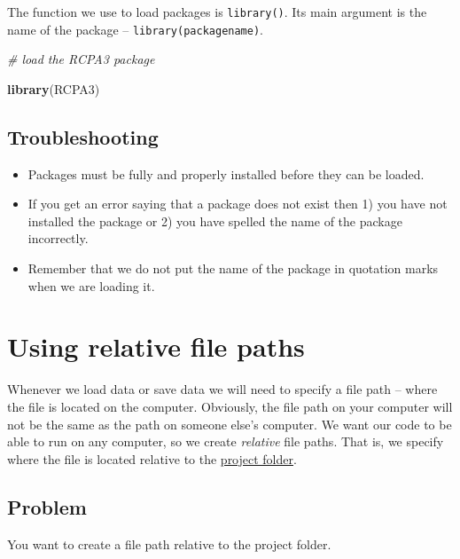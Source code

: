 \documentclass[
]{book}
\newenvironment{Shaded}{\begin{snugshade}}{\end{snugshade}}
\newcommand{\CommentTok}[1]{\textcolor[rgb]{0.56,0.35,0.01}{\textit{#1}}}
\newcommand{\FunctionTok}[1]{\textcolor[rgb]{0.13,0.29,0.53}{\textbf{#1}}}
\newcommand{\NormalTok}[1]{#1}
\providecommand{\tightlist}{%
  \setlength{\itemsep}{0pt}\setlength{\parskip}{0pt}}
\begin{document}
The function we use to load packages is \texttt{library()}. Its main argument is the name of the package -- \texttt{library(packagename)}.

\begin{Shaded}
\begin{Highlighting}[]
\CommentTok{\# load the RCPA3 package}

\FunctionTok{library}\NormalTok{(RCPA3)}
\end{Highlighting}
\end{Shaded}

\hypertarget{troubleshooting-5}{%
\subsection{Troubleshooting}\label{troubleshooting-5}}

\begin{itemize}
\tightlist
\item
  Packages must be fully and properly installed before they can be loaded.
\item
  If you get an error saying that a package does not exist then 1) you have not installed the package or 2) you have spelled the name of the package incorrectly.
\item
  Remember that we do not put the name of the package in quotation marks when we are loading it.
\end{itemize}

\hypertarget{relative-path}{%
\section{Using relative file paths}\label{relative-path}}

Whenever we load data or save data we will need to specify a file path -- where the file is located on the computer. Obviously, the file path on your computer will not be the same as the path on someone else's computer. We want our code to be able to run on any computer, so we create \emph{relative} file paths. That is, we specify where the file is located relative to the \protect\hyperlink{project}{project folder}.

\hypertarget{problem-8}{%
\subsection{Problem}\label{problem-8}}

You want to create a file path relative to the project folder.
\end{document}

